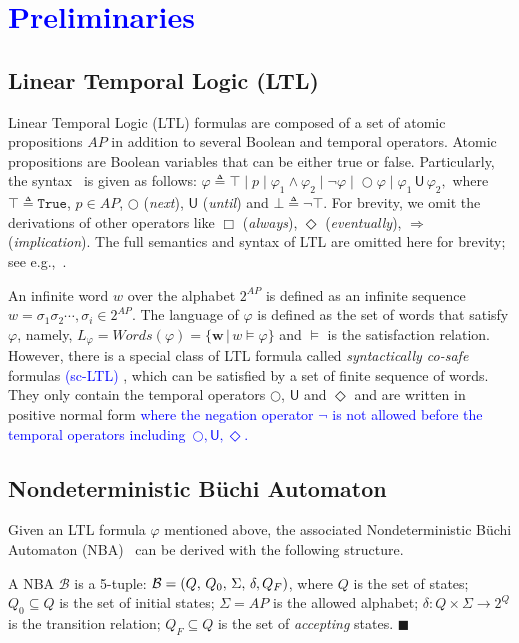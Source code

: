\section{\textcolor{blue}{Preliminaries}}\label{sec:preliminary}
\subsection{Linear Temporal Logic (LTL)}\label{subsec:LTL}
Linear Temporal Logic (LTL) formulas are composed of a set of atomic propositions $AP$
in addition to several Boolean and temporal operators. Atomic propositions are Boolean variables that can
be either true or false.  Particularly, the syntax~\citep{baier2008principles} is given as follows:
$\varphi \triangleq \top \;|\; p  \;|\; \varphi_1 \wedge \varphi_2  \;|\; \neg \varphi  \;|\; \bigcirc \varphi  \;|\;  \varphi_1 \,\textsf{U}\, \varphi_2,$
where $\top\triangleq \texttt{True}$, $p \in AP$, $\bigcirc$ (\emph{next}),
$\textsf{U}$ (\emph{until}) and $\bot\triangleq \neg \top$.
For brevity, we omit the derivations of other operators like $\Box$ (\emph{always}),
 $\Diamond$ (\emph{eventually}), $\Rightarrow$ (\emph{implication}).
The full semantics and syntax of LTL are omitted here for brevity;
see e.g.,~\citep{baier2008principles}.

An infinite {word} $w$ over the alphabet $2^{AP}$ is defined as an
infinite sequence ${w}=\sigma_1\sigma_2\cdots, \sigma_i\in 2^{AP}$.
The language of $\varphi$ is defined as the set of words that satisfy $\varphi$,
namely, $L_\varphi=Words(\varphi)=\{\boldsymbol{w}\,|\,w\models\varphi\}$
and $\models$ is the satisfaction relation.
However, there is a special class of LTL formula called \emph{syntactically co-safe} formulas \textcolor{blue}{(sc-LTL)}  \textcolor{blue}{\citep{belta2017formal}},
which can be satisfied by a set of finite sequence of words.
They only contain the temporal operators $\bigcirc$, $\textsf{U}$ and $\Diamond$
 and are written in positive normal form \textcolor{blue}{where the negation
   operator $\neg$ is not allowed before the temporal
   operators including~$\bigcirc, \textsf{U}, \Diamond$.}

\subsection{Nondeterministic B\"uchi Automaton}\label{subsec:nba}

Given an LTL formula $\varphi$ mentioned above, the associated Nondeterministic B\"{u}chi Automaton (NBA)~\citep{baier2008principles} can be derived with the following structure.
\begin{definition}[NBA] \label{def:nba}
A NBA $\mathcal{B}$ is a 5-tuple: $\mathcal{B}=(Q,\,Q_0,\,\Sigma,\,\delta,\,\\Q_F)$,
where $Q$ is the set of states;
$Q_0\subseteq Q$ is the set of initial states;
$\Sigma=AP$ is the allowed alphabet;
$\delta:Q\times \Sigma\rightarrow2^{Q}$ is the transition relation;
$Q_F\subseteq Q$ is the set of \emph{accepting} states. \hfill $\blacksquare$
\end{definition}

